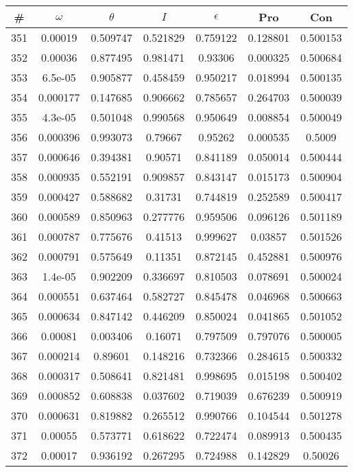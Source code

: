 \newpage
\begin{table}
\begin{tabular}{c|c|c|c|c|c|c}
\# & $\omega$ & $\theta$ & $I$ & $\epsilon$ & Pro & Con\\
\hline
351 & 0.00019 & 0.509747 & 0.521829 & 0.759122 & 0.128801 & 0.500153\\
352 & 0.00036 & 0.877495 & 0.981471 & 0.93306 & 0.000325 & 0.500684\\
353 & 6.5e-05 & 0.905877 & 0.458459 & 0.950217 & 0.018994 & 0.500135\\
354 & 0.000177 & 0.147685 & 0.906662 & 0.785657 & 0.264703 & 0.500039\\
355 & 4.3e-05 & 0.501048 & 0.990568 & 0.950649 & 0.008854 & 0.500049\\
356 & 0.000396 & 0.993073 & 0.79667 & 0.95262 & 0.000535 & 0.5009\\
357 & 0.000646 & 0.394381 & 0.90571 & 0.841189 & 0.050014 & 0.500444\\
358 & 0.000935 & 0.552191 & 0.909857 & 0.843147 & 0.015173 & 0.500904\\
359 & 0.000427 & 0.588682 & 0.31731 & 0.744819 & 0.252589 & 0.500417\\
360 & 0.000589 & 0.850963 & 0.277776 & 0.959506 & 0.096126 & 0.501189\\
361 & 0.000787 & 0.775676 & 0.41513 & 0.999627 & 0.03857 & 0.501526\\
362 & 0.000791 & 0.575649 & 0.11351 & 0.872145 & 0.452881 & 0.500976\\
363 & 1.4e-05 & 0.902209 & 0.336697 & 0.810503 & 0.078691 & 0.500024\\
364 & 0.000551 & 0.637464 & 0.582727 & 0.845478 & 0.046968 & 0.500663\\
365 & 0.000634 & 0.847142 & 0.446209 & 0.850024 & 0.041865 & 0.501052\\
366 & 0.00081 & 0.003406 & 0.16071 & 0.797509 & 0.797076 & 0.500005\\
367 & 0.000214 & 0.89601 & 0.148216 & 0.732366 & 0.284615 & 0.500332\\
368 & 0.000317 & 0.508641 & 0.821481 & 0.998695 & 0.015198 & 0.500402\\
369 & 0.000852 & 0.608838 & 0.037602 & 0.719039 & 0.676239 & 0.500919\\
370 & 0.000631 & 0.819882 & 0.265512 & 0.990766 & 0.104544 & 0.501278\\
371 & 0.00055 & 0.573771 & 0.618622 & 0.722474 & 0.089913 & 0.500435\\
372 & 0.00017 & 0.936192 & 0.267295 & 0.724988 & 0.142829 & 0.50026\\

\end{tabular}
\end{table}
